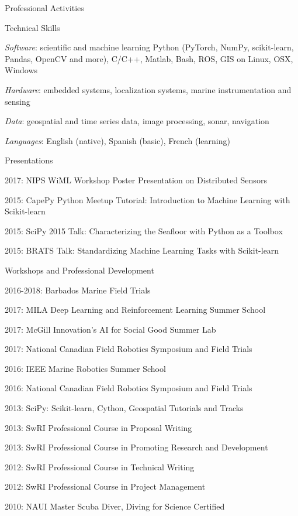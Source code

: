 \documentclass{resume} %
\begin{document}
\begin{rSection}{Professional Activities}
\begin{rSubsection}{Technical Skills}{}{}{}
\item{\emph{Software}: scientific and machine learning Python (PyTorch, NumPy, scikit-learn, Pandas, OpenCV and more), C/C++, Matlab, Bash, ROS, GIS on Linux, OSX, Windows}
\item{\emph{Hardware}: embedded systems, localization systems, marine instrumentation and sensing}
\item{\emph{Data}: geospatial and time series data, image processing, sonar, navigation }
\item{\emph{Languages}: English (native), Spanish (basic), French (learning)}
\end{rSubsection}

\begin{rSubsection}{Presentations}{}{}{}
\item{2017: NIPS WiML Workshop Poster Presentation on Distributed Sensors}
\item{2015: CapePy Python Meetup Tutorial: Introduction to Machine Learning with Scikit-learn }
\item{2015: SciPy 2015 Talk: Characterizing the Seafloor with Python as a Toolbox}
\item{2015: BRATS Talk: Standardizing Machine Learning Tasks with Scikit-learn }
\end{rSubsection}

\begin{rSubsection}{Workshops and Professional Development}{}{}{}
\item{2016-2018: Barbados Marine Field Trials}
\item{2017: MILA Deep Learning and Reinforcement Learning Summer School}
\item{2017: McGill Innovation's AI for Social Good Summer Lab}
\item{2017: National Canadian Field Robotics Symposium and Field Trials}
\item{2016: IEEE Marine Robotics Summer School}
\item{2016: National Canadian Field Robotics Symposium and Field Trials}
\item{2013: SciPy: Scikit-learn, Cython, Geospatial Tutorials and Tracks}
\item{2013: SwRI Professional Course in Proposal Writing}
\item{2013: SwRI Professional Course in Promoting Research and Development}
\item{2012: SwRI Professional Course in Technical Writing}
\item{2012: SwRI Professional Course in Project Management}
\item{2010: NAUI Master Scuba Diver, Diving for Science Certified}
\end{rSubsection}



\end{rSection}
\end{document}
